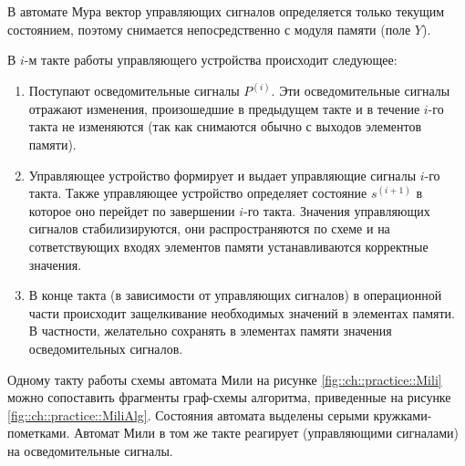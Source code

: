 В автомате Мура вектор управляющих сигналов определяется только текущим состоянием, поэтому снимается непосредственно с модуля памяти (поле $Y$).

В $i$-м такте работы управляющего устройства происходит следующее:
\begin{enumerate}
    \item Поступают осведомительные сигналы $P^{(i)}$. Эти осведомительные сигналы отражают изменения, произошедшие в предыдущем такте и в течение $i$-го такта не изменяются (так как снимаются обычно с выходов элементов памяти).
    
    \item Управляющее устройство формирует и выдает управляющие сигналы $i$-го такта. Также управляющее устройство определяет состояние $s^{(i+1)}$ в которое оно перейдет по завершении $i$-го такта. Значения управляющих сигналов стабилизируются, они распространяются по схеме и на сответствующих входях элементов памяти устанавливаются корректные значения.
    
    \item В конце такта (в зависимости от управляющих сигналов) в операционной части происходит защелкивание необходимых значений в элементах памяти. В частности, желательно сохранять в элементах памяти значения осведомительных сигналов.
\end{enumerate}

Одному такту работы схемы автомата Мили на рисунке \ref{fig::ch::practice::Mili} можно сопоставить фрагменты граф-схемы алгоритма, приведенные на рисунке \ref{fig::ch::practice::MiliAlg}. Состояния автомата выделены серыми кружками-пометками. Автомат Мили в том же такте реагирует (управляющими сигналами) на осведомительные сигналы.

